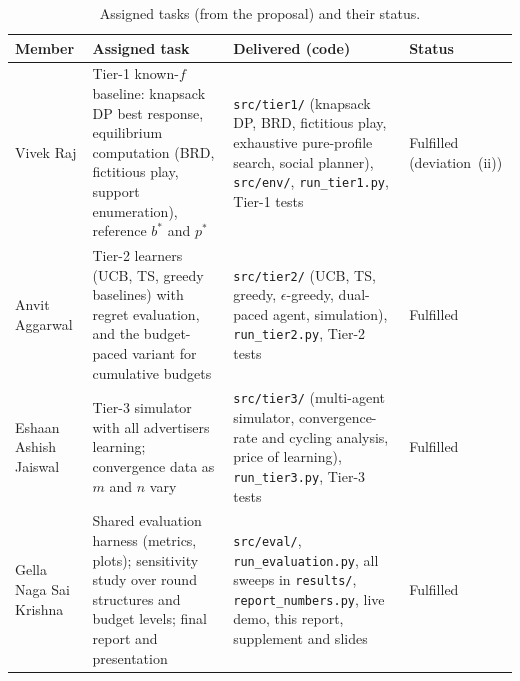 \documentclass{article}
\theoremstyle{definition}
\begin{document}
\begin{table}[h]
\caption{Assigned tasks (from the proposal) and their status.}\label{tab:contrib}
\centering\small
\begin{tabularx}{\linewidth}{@{}p{2.55cm}XXp{1.6cm}@{}}
\toprule
Member & Assigned task & Delivered (code) & Status\\
\midrule
Vivek Raj & Tier-1 known-$f$ baseline: knapsack DP best response, equilibrium computation (BRD,
fictitious play, support enumeration), reference $b^\ast$ and $p^\ast$ &
\texttt{src/tier1/} (knapsack DP, BRD, fictitious play, exhaustive pure-profile search, social planner),
\texttt{src/env/}, \texttt{run\_tier1.py}, Tier-1 tests & Fulfilled (deviation~(ii))\\
Anvit Aggarwal & Tier-2 learners (UCB, TS, greedy baselines) with regret evaluation, and the budget-paced
variant for cumulative budgets & \texttt{src/tier2/} (UCB, TS, greedy, $\epsilon$-greedy, dual-paced agent,
simulation), \texttt{run\_tier2.py}, Tier-2 tests & Fulfilled\\
Eshaan Ashish Jaiswal & Tier-3 simulator with all advertisers learning; convergence data as $m$ and $n$ vary &
\texttt{src/tier3/} (multi-agent simulator, convergence-rate and cycling analysis, price of learning),
\texttt{run\_tier3.py}, Tier-3 tests & Fulfilled\\
Gella Naga Sai Krishna & Shared evaluation harness (metrics, plots); sensitivity study over round structures
and budget levels; final report and presentation & \texttt{src/eval/}, \texttt{run\_evaluation.py}, all
sweeps in \texttt{results/}, \texttt{report\_numbers.py}, live demo, this report, supplement and slides &
Fulfilled\\
\bottomrule
\end{tabularx}
\end{table}
\end{document}
